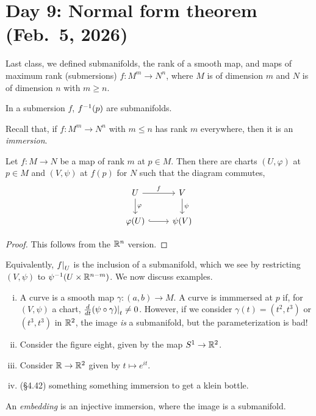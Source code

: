\section{Day 9: Normal form theorem (Feb.\ 5, 2026)}
Last class, we defined submanifolds, the rank of a smooth map, and maps of maximum rank (submersions) $f \colon M^m \to N^n$, where $M$ is of dimension $m$ and $N$ is of dimension $n$ with $m \geq n$.
\begin{fact}
    In a submersion $f$, $f^{-1}(p)$ are submanifolds.
\end{fact}
Recall that, if $f \colon M^m \to N^n$ with $m \leq n$ has rank $m$ everywhere, then it is an \textit{immersion}.
\\[-12pt]
\begin{theorem}
    Let $f \colon M \to N$ be a map of rank $m$ at $p \in M$. Then there are charts $(U, \varphi)$ at $p \in M$ and $(V, \psi)$ at $f(p)$ for $N$ such that the diagram commutes,
    \[ \begin{tikzcd} U \arrow[r, "f"] \arrow[d, "\varphi"] & V \arrow[d, "\psi"] \\ \varphi(U) \arrow[r, hook] & \psi(V) \end{tikzcd} \]
\end{theorem}
\begin{proof}
    This follows from the $\mathbb R^n$ version.
\end{proof}
Equivalently, $\restr{f}{U}$ is the inclusion of a submanifold, which we see by restricting $(V, \psi)$ to $\psi^{-1}(U \times \mathbb R^{n-m})$. We now discuss examples.
\begin{enumerate}[(i)]
    \item A curve is a smooth map $\gamma \colon (a, b) \to M$. A curve is immmersed at $p$ if, for $(V, \psi)$ a chart, $\frac{d}{dt} \restr{(\psi \circ \gamma)}{t} \neq 0$. However, if we consider $\gamma(t) = (t^2, t^3)$ or $(t^3, t^3)$ in $\mathbb R^2$, the image \textit{is} a submanifold, but the parameterization is bad!
    \item Consider the figure eight, given by the map $S^1 \to \mathbb R^2$.
    \item Consider $\mathbb R \to \mathbb R^2$ given by $t \mapsto e^{it}$.
    \item (\S4.42) something something immersion to get a klein bottle.
\end{enumerate}
\begin{definition}
    An \textit{embedding} is an injective immersion, where the image is a submanifold.
\end{definition}
